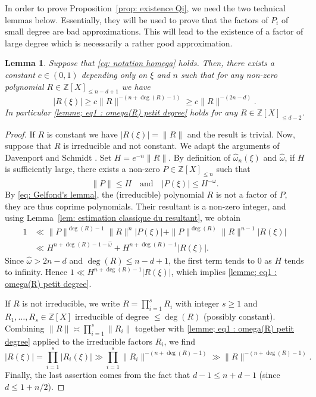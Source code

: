 \documentclass[10pt,a4paper]{amsart}
\numberwithin{equation}{section}
\newcommand\bZ{\mathbb{Z}}
\newcommand\homega{\widehat{\omega}}\newcommand\HH{\mathcal{H}}
\newcommand{\normH}[1]{\|#1\|}
\newcommand\AND{\quad\text{and}\quad}
\theoremstyle{definition}
\theoremstyle{plain}
\newtheorem{Lem}[Def]{Lemma}
\begin{document}
In order to prove Proposition~\ref{prop: existence Qi}, we need the two technical lemmas below. Essentially, they will be used to prove that the factors of $P_i$ of small degree are bad approximations. This will lead to the existence of a factor of large degree which is necessarily a rather good approximation.

\begin{Lem}
\label{lemme: omega(R) petit degre}
Suppose that \eqref{eq: notation homega} holds. Then, there exists a constant $c\in(0,1)$ depending only on $\xi$ and $n$ such that for any non-zero polynomial $R\in \bZ[X]_{\leq n-d+1}$ we have
\begin{equation}
\label{lemme; eq1 : omega(R) petit degree}
|R(\xi)| \geq c\normH{R}^{-(n + \deg(R) - 1)} \geq c\normH{R}^{-(2n-d)}.
\end{equation}
In particular \eqref{lemme; eq1 : omega(R) petit degree} holds for any $R\in\bZ[X]_{\leq d-2}$.
\end{Lem}

\begin{proof}
If $R$ is constant we have $|R(\xi)| = \normH{R}$ and the result is trivial. Now, suppose that $R$ is irreducible and not constant. We adapt the arguments of Davenport and Schmidt \cite[\S 5--6]{davenport1969approximation}. Set $H = e^{-n}\normH{R}$. By definition of $\homega_n(\xi)$ and $\homega$, if $H$ is sufficiently large, there exists a non-zero $P\in\bZ[X]_{\leq n}$ such that
\[
\normH{P} \leq H \AND |P(\xi)| \leq H^{-\homega}.
\]
By \eqref{eq: Gelfond's lemma}, the (irreducible) polynomial $R$ is not a factor of $P$, they are thus coprime polynomials. Their resultant is a non-zero integer, and using Lemma~\ref{lem: estimation classique du resultant}, we obtain
\begin{align*}
1 & \ll \normH{P}^{\deg(R)-1}\normH{R}^{n}|P(\xi)| + \normH{P}^{\deg(R)}\normH{R}^{n-1}|R(\xi)| \\
& \ll H^{n+\deg(R)-1-\homega} + H^{n+\deg(R)-1}|R(\xi)|.
\end{align*}
Since $\homega > 2n-d$ and $\deg(R) \leq n-d+1$, the first term tends to $0$ as $H$ tends to infinity. Hence $ 1 \ll H^{n+\deg(R)-1}|R(\xi)|$, which implies \eqref{lemme; eq1 : omega(R) petit degree}.

If $R$ is not irreducible, we write $R = \prod_{i=1}^{s}R_i$ with integer $s\geq 1$ and $R_1,\dots,R_s\in\bZ[X]$ irreducible of degree $\leq \deg(R)$ (possibly constant). Combining $\normH{R} \asymp \prod_{i=1}^{s}\normH{R_i}$ together with \eqref{lemme; eq1 : omega(R) petit degree} applied to the irreducible factors $R_i$, we find
\begin{equation*}
|R(\xi)| = \prod_{i=1}^{s}|R_i(\xi)| \gg \prod_{i=1}^{s}\normH{R_i}^{-(n + \deg(R) - 1)} \gg \normH{R}^{-(n + \deg(R) - 1)}.
\end{equation*}
Finally, the last assertion comes from the fact that $d-1\leq n+d-1$ (since $d\leq 1+n/2$).
\end{proof}
\end{document}
